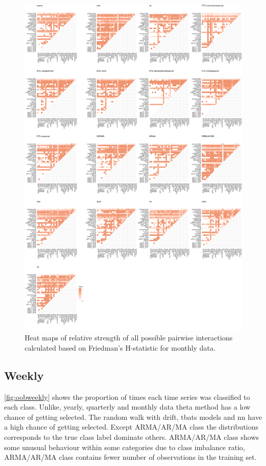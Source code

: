 \documentclass[11pt,a4paper,]{article}
\begin{document}
\begin{figure}
\centering
\includegraphics{figures/friedmanM-1.pdf}
\caption{\label{fig:friedmanM}Heat maps of relative strength of all possible
pairwise interactions calculated based on Friedman's H-statistic for
monthly data.}
\end{figure}

\subsection{Weekly}\label{weekly}

\autoref{fig:oobweekly} shows the proportion of times each time series
was classified to each class. Unlike, yearly, quarterly and monthly data
theta method has a low chance of getting selected. The random walk with
drift, tbats models and nn have a high chance of getting selected.
Except ARMA/AR/MA class the distributions corresponds to the true class
label dominate others. ARMA/AR/MA class shows some unusual behaviour
within some categories due to class imbalance ratio, ARMA/AR/MA class
contains fewer number of observations in the training set.
\end{document}
